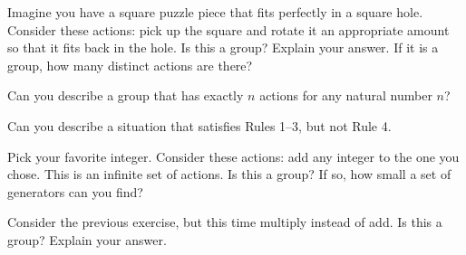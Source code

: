 \begin{exercise}
Imagine you have a square puzzle piece that fits perfectly in a square hole.  Consider these actions: pick up the square and rotate it an appropriate amount so that it fits back in the hole.  Is this a group?  Explain your answer.  If it is a group, how many distinct actions are there?
\end{exercise}

\begin{exercise}
Can you describe a group that has exactly \(n\) actions for any natural number \(n\)?
\end{exercise}

\begin{exercise}
Can you describe a situation that satisfies Rules 1--3, but not Rule 4.
\end{exercise}

\begin{exercise}\label{exer:introducing_Z}%
Pick your favorite integer.  Consider these actions: add any integer to the one you chose.  This is an infinite set of actions.  Is this a group?  If so, how small a set of generators can you find?
\end{exercise}

\begin{exercise}
Consider the previous exercise, but this time multiply instead of add.  Is this a group?  Explain your answer.
\end{exercise}
